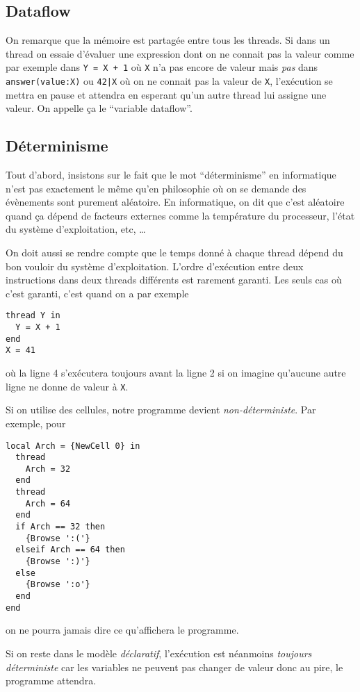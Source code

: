 \subsection{Dataflow}
\label{sec:dataflow}
On remarque que la mémoire est partagée entre tous les threads.
Si dans un thread on essaie d'évaluer une expression dont on ne connait pas
la valeur comme par exemple dans \lstinline|Y = X + 1| où \lstinline|X|
n'a pas encore de valeur mais \emph{pas} dans
\lstinline|answer(value:X)| ou \lstinline$42|X$ où on ne connait pas la
valeur de \lstinline|X|,
l'exécution se mettra en pause et attendra en esperant qu'un autre
thread lui assigne une valeur.
On appelle ça le ``variable dataflow''.

\subsection{Déterminisme}
Tout d'abord, insistons sur le fait que le mot ``déterminisme'' en
informatique n'est pas exactement le même qu'en philosophie où
on se demande des évènements sont purement aléatoire.
En informatique, on dit que c'est aléatoire quand ça dépend de facteurs
externes comme la température du processeur,
l'état du système d'exploitation,
etc, \ldots

On doit aussi se rendre compte que le temps donné à chaque thread
dépend du bon vouloir du système d'exploitation.
L'ordre d'exécution entre deux instructions dans deux threads différents
est rarement garanti.
Les seuls cas où c'est garanti, c'est quand on a par exemple
\begin{lstlisting}
thread Y in
  Y = X + 1
end
X = 41
\end{lstlisting}
où la ligne 4 s'exécutera toujours avant la ligne 2 si on imagine qu'aucune
autre ligne ne donne de valeur à \lstinline|X|.

Si on utilise des cellules,
notre programme devient \emph{non-déterministe}.
Par exemple, pour
\begin{lstlisting}
local Arch = {NewCell 0} in
  thread
    Arch = 32
  end
  thread
    Arch = 64
  end
  if Arch == 32 then
    {Browse ':('}
  elseif Arch == 64 then
    {Browse ':)'}
  else
    {Browse ':o'}
  end
end
\end{lstlisting}
on ne pourra jamais dire ce qu'affichera le programme.

Si on reste dans le modèle \emph{déclaratif},
l'exécution est néanmoins \emph{toujours déterministe}
car les variables ne peuvent pas changer de valeur donc au pire,
le programme attendra.

